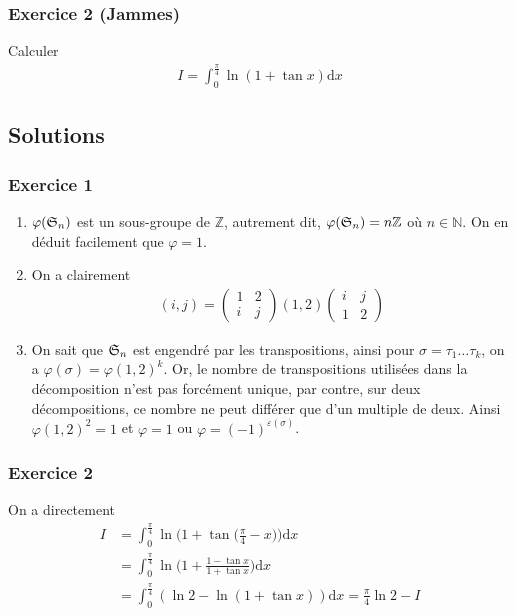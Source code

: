 \documentclass{article}
\begin{document}
\subsubsection*{Exercice 2 (Jammes)}
Calculer \begin{align*}
I = \int_{0}^{\frac{\pi}{4}}\ln{(1+\tan{x})}\mathrm{d}x
\end{align*}
\subsection*{Solutions}
\subsubsection*{Exercice 1}
\begin{enumerate}
\item $\varphi(\frak{S}_n)$ est un sous-groupe de $\mathbb{Z}$, autrement dit, $\varphi(\frak{S}_n) = n\mathbb{Z}$ où $n\in\mathbb{N}$. On en déduit facilement que $\varphi = 1$.
\item On a clairement
\begin{align*}
(i,j) = \begin{pmatrix}1 & 2\\i & j\end{pmatrix}(1, 2) \begin{pmatrix}i& j\\1 & 2\end{pmatrix}
\end{align*}

\item On sait que $\frak{S}_n$ est engendré par les transpositions, ainsi pour $\sigma = \tau_1\ldots \tau_k$, on a $\varphi(\sigma)=\varphi(1,2)^k$. Or, le nombre de transpositions utilisées dans la décomposition n'est pas forcément unique, par contre, sur deux décompositions, ce nombre ne peut différer que d'un multiple de deux. Ainsi $\varphi(1,2)^2=1$ et $\varphi = 1$ ou $\varphi = (-1)^{\varepsilon({\sigma})}$.
\end{enumerate}
\subsubsection*{Exercice 2}
On a directement
\begin{align*}
I &= \int_{0}^{\frac{\pi}{4}}\ln{\bigg(1+\tan{\bigg(\frac{\pi}{4}-x\bigg)}\bigg)}\mathrm{d}x\\
&=\int_{0}^{\frac{\pi}{4}}\ln{\bigg(1+\frac{1-\tan{x}}{1+\tan{x}}\bigg)}\mathrm{d}x\\
&=\int_{0}^{\frac{\pi}{4}}(\ln{2}-\ln{(1+\tan{x})})\mathrm{d}x = \frac{\pi}{4}\ln{2}-I\\
\end{align*}
\end{document}
